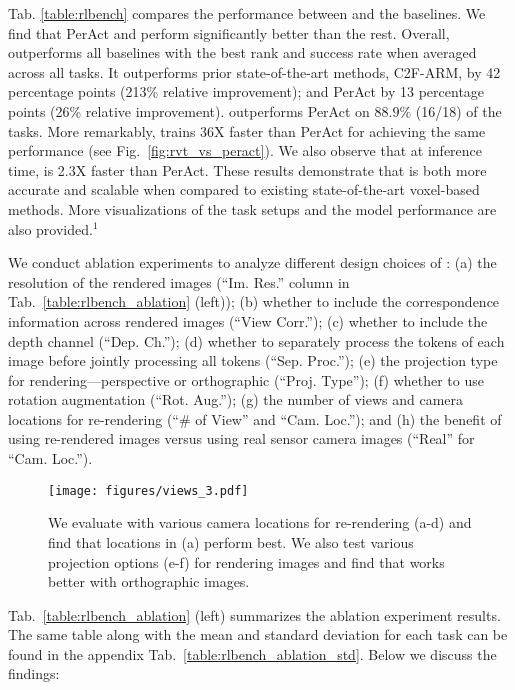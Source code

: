 Tab. \ref{table:rlbench} compares the performance between \method and the baselines. We find that PerAct and \method perform significantly better than the rest.
Overall, \method outperforms all baselines with the best rank and success rate when averaged across all tasks. It outperforms prior state-of-the-art methods, C2F-ARM, by 42 percentage points (213\% relative improvement); and PerAct by 13 percentage points (26\% relative improvement). \method outperforms PerAct on $88.9\%$ (16/18) of the tasks. More remarkably, \method trains 36X faster than PerAct for achieving the same performance (see Fig.~\ref{fig:rvt_vs_peract}). We also observe that at inference time, \method is 2.3X faster than PerAct. 
These results demonstrate that \method is both more accurate and scalable when compared to existing state-of-the-art voxel-based methods. More visualizations of the task setups and the model performance are also provided.$^1$

We conduct ablation experiments to analyze different design choices of \method: (a) the resolution of the rendered images (``Im. Res.'' column in Tab.~\ref{table:rlbench_ablation} (left)); (b) whether to include the correspondence information across rendered images (``View Corr.''); (c) whether to include the depth channel (``Dep. Ch.''); (d) whether to separately process the tokens of each image before jointly processing all tokens (``Sep. Proc.''); (e) the projection type for rendering---perspective or orthographic (``Proj. Type''); (f) whether to use rotation augmentation (``Rot. Aug.''); (g) the number of views and camera locations for re-rendering (``\# of View'' and ``Cam. Loc.''); and (h) the benefit of using re-rendered images versus using real sensor camera images (``Real'' for ``Cam. Loc.'').
\begin{figure*}[!t]
\centering
\texttt{[image: figures/views\_3.pdf]}
\caption{We evaluate \method with various camera locations for re-rendering (a-d) and find that locations in (a) perform best. We also test various projection options (e-f) for rendering images and find that \method works better with orthographic images.}
\vspace{-3mm}
\label{fig:view}
\end{figure*}

Tab.~\ref{table:rlbench_ablation} (left) summarizes the ablation experiment results. The same table along with the mean and standard deviation for each task can be found in the appendix Tab.~\ref{table:rlbench_ablation_std}. Below we discuss the findings: 

